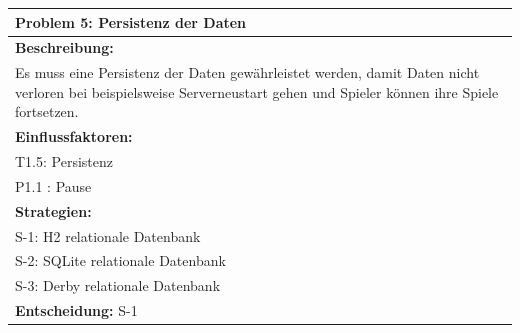 \documentclass[fontsize=12pt,paper=a4,twoside]{scrartcl}
\begin{document}
\begin{longtable}{|p{15cm}|}
\hline
Problem 5: Persistenz der Daten                                                                           
\\ \hline                                                                                                                                                                                                                                                                                                                                                                                                                                                                                                                                                        
\textbf{Beschreibung:} \\
Es muss eine Persistenz der Daten gewährleistet werden, damit Daten nicht verloren bei beispielsweise Serverneustart gehen und Spieler können ihre Spiele fortsetzen.
\\ \hline
\textbf{Einflussfaktoren:} \\
T1.5: Persistenz \\
P1.1 : Pause
\\ \hline
\textbf{Strategien:} \\
S-1: H2 relationale Datenbank\\
S-2: SQLite relationale Datenbank\\
S-3: Derby relationale Datenbank
 \\ \hline
 \textbf{Entscheidung:} S-1
\\ \hline
\end{longtable}
\end{document}
